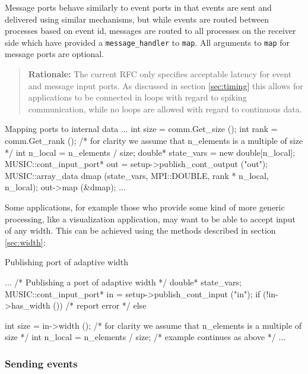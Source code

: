 \documentclass[a4paper]{report}
\newenvironment{rationale}%
{\par\begin{quote}\textbf{Rationale:}}%
{\par\end{quote}}
\begin{document}
Message ports behave similarly to event ports in that events are sent
and delivered using similar mechanisms, but while events are routed
between processes based on event id, messages are routed to all
processes on the receiver side which have provided a
\lstinline|message_handler| to \lstinline|map|.  All arguments to
\lstinline|map| for message ports are optional.

\begin{rationale}
  The current RFC only specifies acceptable latency for event and
  message input ports.  As discussed in section \ref{sec:timing} this
  allows for applications to be connected in loops with regard to
  spiking communication, while no loops are allowed with regard to
  continuous data.
\end{rationale}

\begin{code}{Mapping ports to internal data\label{code:mapping}}
{
  ...
  int size = comm.Get_size ();
  int rank = comm.Get_rank ();
  /* for clarity we assume that n_elements
     is a multiple of size */
  int n_local = n_elements / size;
  double* state_vars = new double[n_local];
  MUSIC::cont_input_port* out =
     setup->publish_cont_output ("out");
  MUSIC::array_data dmap (state_vars, MPI::DOUBLE,
                          rank * n_local, n_local);
  out->map (&dmap);
  ...
}
\end{code}

Some applications, for example those who provide some kind of more
generic processing, like a visualization application, may want to be
able to accept input of any width.  This can be achieved using the
methods described in section \ref{sec:width}:

\begin{code}{Publishing port of adaptive width\label{code:adaptivewidth}}
{
  ...
  /* Publishing a port of adaptive width */
  double* state_vars;
  MUSIC::cont_input_port* in =
     setup->publish_cont_input ("in");
  if (!in->has_width ())
    /* report error */
  else
    {
      int size = in->width ();
      /* for clarity we assume that n_elements
         is a multiple of size */
      int n_local = n_elements / size;
      /* example continues as above */
      ...
      
    }
}
\end{code}

\subsubsection{Sending events}
\end{document}
